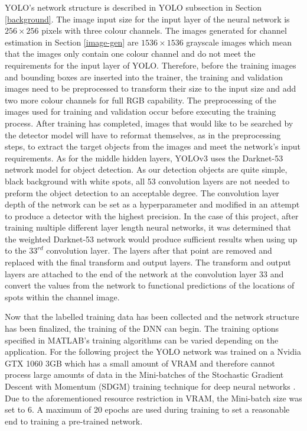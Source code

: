 YOLO's network structure is described in YOLO subsection in Section \ref{background}. The image input size for the input layer of the neural network is $256 \times 256$ pixels with three colour channels. The images generated for channel estimation in Section \ref{image-gen} are $1536 \times 1536$ grayscale images which mean that the images only contain one colour channel and do not meet the requirements for the input layer of YOLO. Therefore, before the training images and bounding boxes are inserted into the trainer, the training and validation images need to be preprocessed to transform their size to the input size and add two more colour channels for full RGB capability. The preprocessing of the images used for training and validation occur before executing the training process. After training has completed, images that would like to be searched by the detector model will have to reformat themselves, as in the preprocessing steps, to extract the target objects from the images and meet the network's input requirements. As for the middle hidden layers, YOLOv3 uses the Darknet-53 network model for object detection. As our detection objects are quite simple, black background with white spots, all 53 convolution layers are not needed to preform the object detection to an acceptable degree. The convolution layer depth of the network can be set as a hyperparameter and modified in an attempt to produce a detector with the highest precision. In the case of this project, after training multiple different layer length neural networks, it was determined that the weighted Darknet-53 network would produce sufficient results when using up to the $33^{rd}$ convolution layer. The layers after that point are removed and replaced with the final transform and output layers. The transform and output layers are attached to the end of the network at the convolution layer 33 and convert the values from the network to functional predictions of the locations of spots within the channel image.

Now that the labelled training data has been collected and the network structure has been finalized, the training of the DNN can begin. The training options specified in MATLAB's training algorithms can be varied depending on the application. For the following project the YOLO network was trained on a Nvidia GTX 1060 3GB which has a small amount of VRAM and therefore cannot process large amounts of data in the Mini-batches of the Stochastic Gradient Descent with Momentum (SDGM) training technique for deep neural networks \cite{Burkov2019, Matlab2021a}. Due to the aforementioned resource restriction in VRAM, the Mini-batch size was set to 6. A maximum of 20 epochs are used during training to set a reasonable end to training a pre-trained network.

